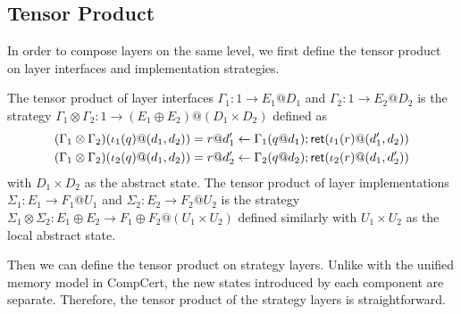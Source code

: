 \documentclass[acmsmall,review,anonymous]{acmart}\settopmatter{printfolios=true,printccs=false,printacmref=false}
\begin{document}
\subsection{Tensor Product} %
\label{sec:stcal:tcomp}
In order to compose layers
on the same level,
we first define
the tensor product
on layer interfaces
and implementation strategies.
\begin{definition}
  The tensor product of layer interfaces
  $\Gamma_1 : 1 \rightarrow E_1@D_1$
  and $\Gamma_2 : 1 \rightarrow E_2@D_2$
  is the strategy
  $\Gamma_1 \otimes \Gamma_2:
  1 \rightarrow (E_1\oplus E_2) @ (D_1 \times D_2)$
  defined as
  \begin{align*}
    & (\Gamma_1 \otimes \Gamma_2)(\iota_1(q)@(d_1,d_2)) =
      r@d'_1 \leftarrow \Gamma_1(q@d_1);  \mathsf{ret} (\iota_1(r)@(d'_1, d_2))\\
    & (\Gamma_1 \otimes \Gamma_2)(\iota_2(q)@(d_1,d_2)) =
      r@d'_2 \leftarrow \Gamma_2(q@d_2);  \mathsf{ret} (\iota_2(r)@(d_1, d'_2))
  \end{align*}
  with $D_1 \times D_2$ as the abstract state.
  The tensor product of layer implementations
  $\Sigma_1: E_1 \rightarrow F_1@U_1$
  and $\Sigma_2: E_2 \rightarrow F_2@U_2$
  is the strategy
  $\Sigma_1 \otimes \Sigma_2:
  E_1\oplus E_2 \rightarrow F_1\oplus F_2@(U_1 \times U_2)$
  defined similarly
  with $U_1 \times U_2$ as the local abstract state.
\end{definition}

Then we can define the tensor product
on strategy layers.
Unlike with the unified memory model
in CompCert,
the new states introduced
by each component are separate.
Therefore, the tensor product
of the strategy layers
is straightforward.
\end{document}
